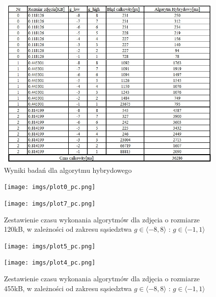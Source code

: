 \documentclass[document.tex]{subfiles}
\begin{document}
\begin{figure}[h]
\includegraphics[scale=0.75]{imgs/results_pc_hybrid.jpg}
\caption{Wyniki badań dla algorytmu hybrydowego}
\label{fig:results_pc_hybrid}
\end{figure}


\begin{figure}[h]
\texttt{[image: imgs/plot0\_pc.png]}
\caption*{}
\label{fig:results_pc_hybrid}
\end{figure}

\begin{figure}[h]
\texttt{[image: imgs/plot7\_pc.png]}
\caption{Zestawienie czasu wykonania algorytmów dla zdjęcia o rozmiarze 120kB, 
        w zależności od zakresu sąsiedztwa $g\in \langle -8, 8 \rangle$ : $g\in \langle -1, 1 \rangle$ }
\label{fig:results_pc_hybrid}
\end{figure}

\begin{figure}[h]
\texttt{[image: imgs/plot5\_pc.png]}
\caption*{}
\label{fig:results_pc_hybrid}
\end{figure}

\begin{figure}[h]
\texttt{[image: imgs/plot4\_pc.png]}
\caption{Zestawienie czasu wykonania algorytmów dla zdjęcia o rozmiarze 455kB, 
        w zależności od zakresu sąsiedztwa $g\in \langle -8, 8 \rangle$ : $g\in \langle -1, 1 \rangle$ }
\label{fig:results_pc_hybrid}
\end{figure}
\end{document}
